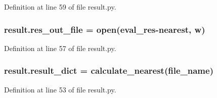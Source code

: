 Definition at line 59 of file result.\+py.

\subsubsection[{\texorpdfstring{res\+\_\+out\+\_\+file}{res_out_file}}]{\setlength{\rightskip}{0pt plus 5cm}result.\+res\+\_\+out\+\_\+file = open(\textquotesingle{}eval\+\_\+res-\/nearest\textquotesingle{}, \textquotesingle{}w\textquotesingle{})}\hypertarget{namespaceresult_a3e9c34d216aa54944d35a8d48a885ee9}{}\label{namespaceresult_a3e9c34d216aa54944d35a8d48a885ee9}


Definition at line 57 of file result.\+py.

\subsubsection[{\texorpdfstring{result\+\_\+dict}{result_dict}}]{\setlength{\rightskip}{0pt plus 5cm}result.\+result\+\_\+dict = {\bf calculate\+\_\+nearest}({\bf file\+\_\+name})}\hypertarget{namespaceresult_ac6537f54ad765b7bd38c3ac05ba11853}{}\label{namespaceresult_ac6537f54ad765b7bd38c3ac05ba11853}


Definition at line 53 of file result.\+py.

